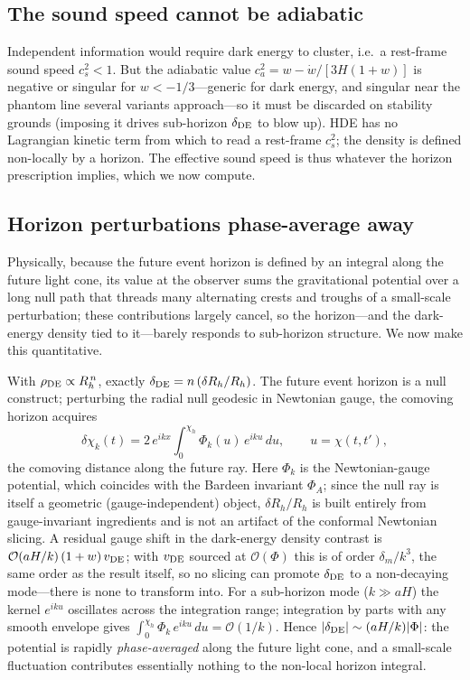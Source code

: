 \documentclass[twocolumn,10pt]{article}
\begin{document}
\subsection{The sound speed cannot be adiabatic}

Independent information would require dark energy to cluster, i.e.\ a rest-frame
sound speed $c_s^2<1$. But the adiabatic value
$c_a^2=w-\dot w/[3H(1+w)]$ is negative or singular for $w<-1/3$---generic for
dark energy, and singular near the phantom line several variants approach---so
it must be discarded on stability grounds (imposing it drives sub-horizon
$\delta_{\rm DE}$ to blow up). HDE has no Lagrangian kinetic term from which to
read a rest-frame $c_s^2$; the density is defined non-locally by a horizon.
The effective sound speed is thus whatever the horizon prescription implies,
which we now compute.

\subsection{Horizon perturbations phase-average away}

Physically, because the future event horizon is defined by an integral along
the future light cone, its value at the observer sums the gravitational
potential over a long null path that threads many alternating crests and
troughs of a small-scale perturbation; these contributions largely cancel, so
the horizon---and the dark-energy density tied to it---barely responds to
sub-horizon structure. We now make this quantitative.

With $\rho_{\rm DE}\propto R_h^{\,n}$, exactly
$\delta_{\rm DE}=n\,(\delta R_h/R_h)$. The future event horizon is a null
construct; perturbing the radial null geodesic in Newtonian gauge, the comoving
horizon acquires
\begin{equation}
\delta\chi_k(t)=2\,e^{ikx}\!\int_0^{\chi_h}\!\Phi_k(u)\,e^{iku}\,du,
\qquad u=\chi(t,t') ,
\label{eq:dchi}
\end{equation}
the comoving distance along the future ray. Here $\Phi_k$ is the
Newtonian-gauge potential, which coincides with the Bardeen invariant
$\Phi_A$; since the null ray is itself a geometric (gauge-independent) object,
$\delta R_h/R_h$ is built entirely from gauge-invariant ingredients and is not
an artifact of the conformal Newtonian slicing. A residual gauge shift in the
dark-energy density contrast is $\mathcal{O}(aH/k)\,(1+w)\,v_{\rm DE}$; with
$v_{\rm DE}$ sourced at $\mathcal{O}(\Phi)$ this is of order $\delta_m/k^3$,
the same order as the result itself, so no slicing can promote $\delta_{\rm DE}$
to a non-decaying mode---there is none to transform into. For a sub-horizon
mode
($k\gg aH$) the kernel $e^{iku}$ oscillates across the integration range;
integration by parts with any smooth envelope gives
$\int_0^{\chi_h}\Phi_k\,e^{iku}\,du=\mathcal{O}(1/k)$. Hence
$|\delta_{\rm DE}|\sim(aH/k)|\Phi|$: the potential is rapidly
\emph{phase-averaged} along the future light cone, and a small-scale
fluctuation contributes essentially nothing to the non-local horizon integral.
\end{document}
